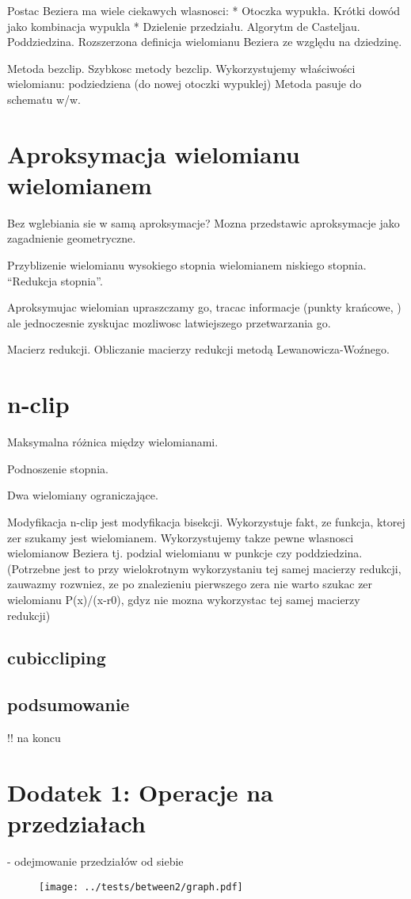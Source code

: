 \documentclass[11pt,a4paper,oneside]{report}
\begin{document}
Postac Beziera ma wiele ciekawych wlasnosci:
* Otoczka wypukła. Krótki dowód jako kombinacja wypukla
* Dzielenie przedziału. Algorytm de Casteljau. Poddziedzina. Rozszerzona definicja wielomianu Beziera ze względu na dziedzinę.

Metoda bezclip. Szybkosc metody bezclip.
Wykorzystujemy właściwości wielomianu: podziedziena (do nowej otoczki wypuklej)
Metoda pasuje do schematu w/w.

\section{Aproksymacja wielomianu wielomianem}

Bez wglebiania sie w samą aproksymacje? Mozna przedstawic aproksymacje jako zagadnienie geometryczne.

Przyblizenie wielomianu wysokiego stopnia wielomianem niskiego stopnia. ``Redukcja stopnia''. 

Aproksymujac wielomian upraszczamy go, tracac informacje (punkty krańcowe, ) ale jednoczesnie zyskujac mozliwosc latwiejszego przetwarzania go.

Macierz redukcji. Obliczanie macierzy redukcji metodą Lewanowicza-Woźnego.

\section{n-clip}

Maksymalna różnica między wielomianami.

Podnoszenie stopnia.

Dwa wielomiany ograniczające.

Modyfikacja n-clip jest modyfikacja bisekcji. Wykorzystuje fakt, ze funkcja, ktorej zer szukamy jest wielomianem. Wykorzystujemy takze pewne wlasnosci wielomianow Beziera tj. podzial wielomianu w punkcje czy poddziedzina. (Potrzebne jest to przy wielokrotnym wykorzystaniu tej samej macierzy redukcji, zauwazmy rozwniez, ze po znalezieniu pierwszego zera nie warto szukac zer wielomianu P(x)/(x-r0), gdyz nie mozna wykorzystac tej samej macierzy redukcji)

\subsection{cubiccliping}

\subsection{podsumowanie}

!! na koncu

\section{Dodatek 1: Operacje na przedziałach}

- odejmowanie przedziałów od siebie



\begin{center}
\begin{figure}
\texttt{[image: ../tests/between2/graph.pdf]}
\end{figure}
\end{center}
\end{document}
